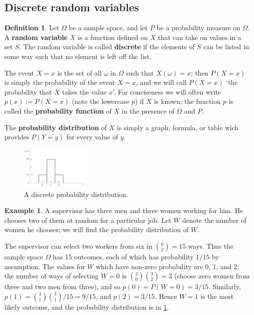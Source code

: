\documentclass[a4paper,leqno]{article}
\numberwithin{equation}{section}
\theoremstyle{definition}
\newtheorem{defn}[equation]{Definition}
\newtheorem{ex}[equation]{Example}
\theoremstyle{remark}
\newcommand{\df}{\textbf}
\begin{document}
\subsection{Discrete random variables}

\begin{defn}
  Let $ \Omega $ be a sample space, and let $ P $ be a probability measure on $ \Omega $. A \df{random variable} $ X $ is a function defined
  on $ X $ that can take on values in a set $ S $. The random variable is called \df{discrete} if the elements of $ S $ can be listed in
  some way such that no element is left off the list.

  The event $ X = x $ is the set of all $ \omega $ in $ \Omega $ such that $ X(\omega) = x $; then $ P(X = x) $ is simply the probability
  of the event $ X = x $, and we will call $ P(X = x) $ `the probability that $ X $ takes the value $ x $'. For conciseness we will often
  write $ p(x) := P(X = x) $ (note the lowercase $ p $) if $ X $ is known; the function $ p $ is called the \df{probability function} of $ X $
  in the presence of $ \Omega $ and $ P $.

  The \df{probability distribution} of $ X $ is simply a graph, formula, or table wich provides $ P(Y = y) $ for every value of $ y $.
\end{defn}

\begin{figure}
  \centering
  \includegraphics[width=0.3\textwidth]{pd1}
  \caption{A discrete probability distribution.\label{fig:pd1}}
\end{figure}

\begin{ex}\label{ex:pd1}
  A supervisor has three men and three women working for him. He chooses two of them at random for a particular job. Let $ W $ denote
  the number of women he chooses; we will find the probability distribution of $ W $.

  The supervisor can select two workers from six in $ \binom{6}{2} = 15 $ ways. Thus the sample space $ \Omega $ has 15 outcomes, each
  of which has probability $ 1/15 $ by assumption. The values for $ W $ which have non-zero probability are 0, 1, and 2; the number
  of ways of selecting $ W = 0 $ is $ \binom{3}{0} \binom{3}{2} = 3 $ (choose zero women from three and two men from three), and
  so $ p(0) = P(W = 0) = 3/15 $. Similarly, $ p(1) = \binom{3}{1}\binom{3}{1}/15 = 9/15 $, and $ p(2) = 3/15 $. Hence $ W = 1 $ is the most
  likely outcome, and the probability distribution is in \ref{fig:pd1}.
\end{ex}
\end{document}
